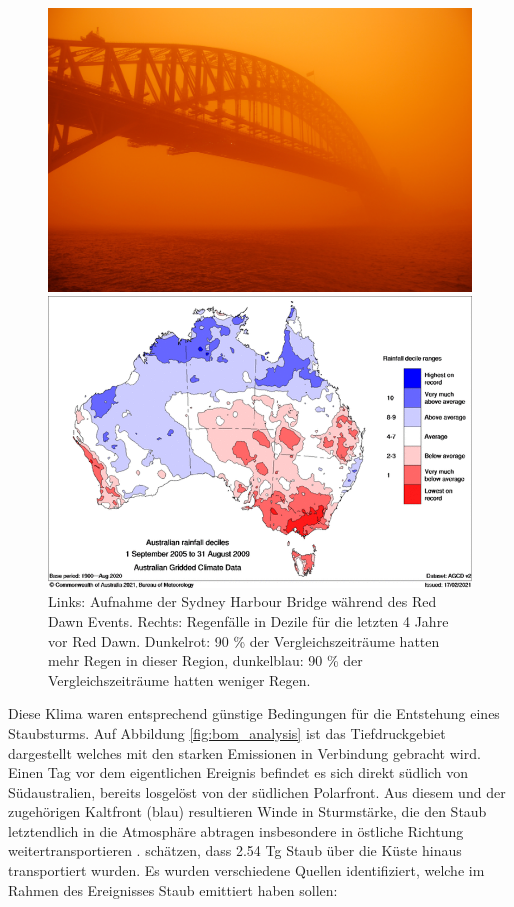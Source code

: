 \documentclass[12pt,a4paper,onecolumn]{scrartcl}
\begin{document}
\begin{figure}[ht]
	\begin{minipage}[c]{0.5\textwidth}
		\includegraphics[width=\textwidth]{bilder/reddawn/SHB.jpg}
	\end{minipage}\hfill
	\begin{minipage}[c]{0.49\textwidth}
		\includegraphics[width=\textwidth]{bilder/reddawn/drought.png}
	\end{minipage}\hfill
	\caption{Links: Aufnahme der Sydney Harbour Bridge während des Red Dawn Events. Rechts: Regenfälle in Dezile für die letzten 4 Jahre vor Red Dawn. Dunkelrot: 90 \% der Vergleichszeiträume hatten mehr Regen in dieser Region, dunkelblau: 90 \% der Vergleichszeiträume hatten weniger Regen.} \label{fig:reddawn}
\end{figure}
Diese Klima waren entsprechend günstige Bedingungen für die Entstehung eines Staubsturms. Auf Abbildung \ref{fig:bom_analysis} ist das Tiefdruckgebiet dargestellt welches mit den starken Emissionen in Verbindung gebracht wird. Einen Tag vor dem eigentlichen Ereignis befindet es sich direkt südlich von Südaustralien, bereits losgelöst von der südlichen Polarfront. Aus diesem und der zugehörigen Kaltfront (blau) resultieren Winde in Sturmstärke, die den Staub letztendlich in die Atmosphäre abtragen insbesondere in östliche Richtung weitertransportieren \citep{Leys.2011}.\citet{Leys.2011} schätzen, dass 2.54 Tg Staub über die Küste hinaus transportiert wurden.  Es wurden verschiedene Quellen identifiziert, welche im Rahmen des Ereignisses Staub emittiert haben sollen:
\end{document}
